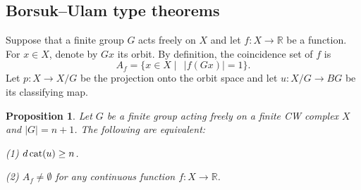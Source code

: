 \documentclass{amsart}
\numberwithin{equation}{section}
\theoremstyle{plain}
\newtheorem{prop}[thm]{Proposition}
\theoremstyle{definition}
\def\cat{\protect\operatorname{cat}}
\begin{document}
\subsection{Borsuk--Ulam type theorems}
Suppose that a finite group $G$ acts freely on $X$ and let $f:X\to\mathbb R$ be a function. For $x\in X$, denote by $Gx$ its orbit.
By definition, the coincidence set of $f$ is
$$
A_f=\{x\in X\mid\ \ |f(Gx)|=1\}.
$$
Let $p:X\to X/G$ be the projection onto the orbit space and let $u:X/G\to BG$ be its classifying map.
\begin{prop}\label{BU}
Let $G$ be a finite group  acting freely on a finite CW complex $X$ and $|G|=n+1$. The following are equivalent:

{\rm (1)} $d\cat(u)\ge n$. 

{\rm (2)} $A_f\ne\emptyset$ for any continuous function $f:X\to\mathbb R$. 


\end{prop}
\end{document}
